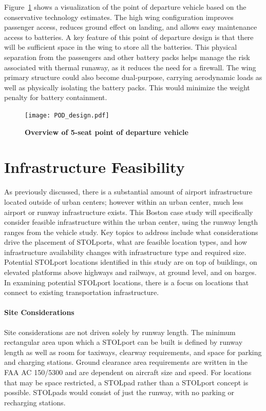 \documentclass[]{aiaa-tc}%
\begin{document}
Figure~\ref{f:vehicle} shows a visualization of the point of departure vehicle based on the conservative technology estimates.  The high wing configuration improves passenger access, reduces ground effect on landing, and allows easy maintenance access to batteries.  A key feature of this point of departure design is that there will be sufficient space in the wing to store all the batteries.  This physical separation from the passengers and other battery packs helps manage the risk associated with thermal runaway, as it reduces the need for a firewall.  The wing primary structure could also become dual-purpose, carrying aerodynamic loads as well as physically isolating the battery packs.  This would minimize the weight penalty for battery containment. 
\begin{figure}[h!]
 
     \texttt{[image: POD\_design.pdf]}
 
    \caption{\textbf{Overview of 5-seat point of departure vehicle}}
 \label{f:vehicle}
 \end{figure}

\section{Infrastructure Feasibility}
As previously discussed, there is a substantial amount of airport infrastructure located outside of urban centers; however within an urban center, much less airport or runway infrastructure exists. This Boston case study will specifically consider feasible infrastructure within the urban center, using the runway length ranges from the vehicle study.  Key topics to address include what considerations drive the placement of STOLports, what are feasible location types, and how infrastructure availability changes with infrastructure type and required size.  Potential STOLport locations identified in this study  are on top of buildings, on elevated platforms above highways and railways, at ground level, and on barges. In examining potential STOLport locations, there is a focus on locations that connect to existing transportation infrastructure.

\paragraph{Site Considerations}
Site considerations are not driven solely by runway length. The minimum rectangular area upon which a STOLport can be built is defined by runway length as well as room for taxiways, clearway requirements, and space for parking and charging stations. Ground clearance area requirements are written in the FAA AC 150/5300 and are dependent on aircraft size and speed\cite{AC150}. For locations that may be space restricted, a STOLpad rather than a STOLport concept is possible.  STOLpads would consist of just the runway, with no parking or recharging stations. 
\end{document}
